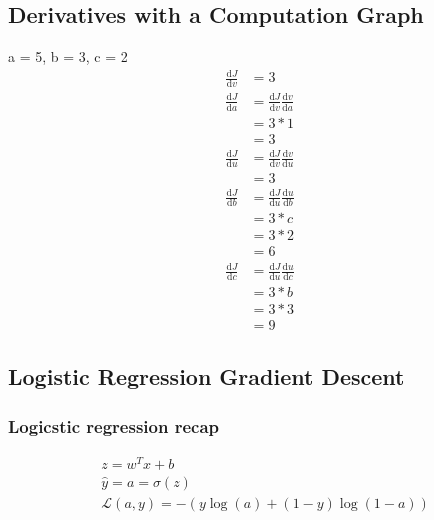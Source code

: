 \subsection{Derivatives with a Computation Graph}
a = 5, b = 3, c = 2
\begin{align}
	\frac{\mathrm{d}J}{\mathrm{d}v} &= 3 \\
	\frac{\mathrm{d}J}{\mathrm{d}a} &= \frac{\mathrm{d}J}{\mathrm{d}v} \frac{\mathrm{d}v}{\mathrm{d}a} \\
	&= 3 * 1 \\
	&= 3 \\
	\frac{\mathrm{d}J}{\mathrm{d}u} &= \frac{\mathrm{d}J}{\mathrm{d}v} \frac{\mathrm{d}v}{\mathrm{d}u} \\ 
	&= 3 \\
	\frac{\mathrm{d}J}{\mathrm{d}b} &= \frac{\mathrm{d}J}{\mathrm{d}u} \frac{\mathrm{d}u}{\mathrm{d}b} \\
	&= 3 * c \\
	&= 3 * 2 \\
	&= 6 \\
	\frac{\mathrm{d}J}{\mathrm{d}c} &= \frac{\mathrm{d}J}{\mathrm{d}u} \frac{\mathrm{d}u}{\mathrm{d}c} \\
	&= 3 * b \\
	&= 3 * 3 \\
	&= 9
\end{align}


\subsection{Logistic Regression Gradient Descent}
\subsubsection{Logicstic regression recap}
\begin{align}
	&z = w^Tx + b \\
	&\hat{y} = a = \sigma(z) \\
	&\mathcal{L}(a, y) = -(y\log(a) + (1-y)\log(1 - a))
\end{align}

